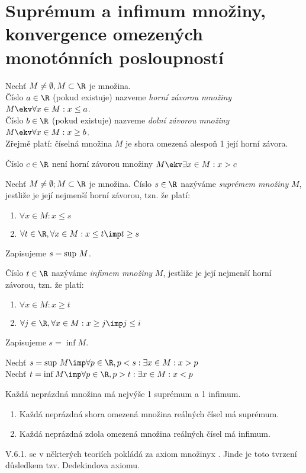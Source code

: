 
\BeginDoc{}
\def\posloup{$\zs{a_n}_{n=1}^{\infty}$}
\def\pos#1{\zs{#1}_{n=1}^{\infty}}
\def\li{\lim_{n\rightarrow\infty}}
\def\sup{{\rm sup\ }}
\def\sciwinfup{{\rm inf\ }}
\section{Suprémum a infimum množiny, konvergence omezených
monotónních posloupností}

\Def Nechť $M \neq \emptyset , M\subset \R$ je množina.\\
Číslo $a\in\R$ (pokud existuje) nazveme \emph{horní závorou množiny} $M\ekv \forall x \in M : x \le a$.\\
Číslo $b\in\R$ (pokud existuje) nazveme \emph{dolní  závorou množiny} $M\ekv \forall x \in M : x \ge b$.\\

\Pozenum
Zřejmě platí: číselná množina $M$ je shora omezená alespoň 1 její horní závora.
\item
	Číslo $c\in\R$  není horní závorou množiny $M\ekv \exists x \in M : x>c$
\End

\Def
Nechť $M\neq \emptyset; M\subset \R$ je množina.
Číslo $s\in\R$ nazýváme \emph{suprémem množiny} $M$, jestliže je její nejmenší horní závorou,
tzn. že platí:
\begin{enumerate}
	\item $\forall x \in M : x\le s$
	\item $\forall t \in \R,\forall x\in M: x \le t \imp t \ge s$
\end{enumerate}
Zapisujeme $s=\sup M$.

Číslo $t\in\R$ nazýváme \emph{infimem množiny} $M$, jestliže je její nejmenší horní závorou,
tzn. že platí:
\begin{enumerate}
	\item $\forall x \in M : x\ge t$
	\item $\forall j \in \R,\forall x\in M: x \ge j \imp j \le i$
\end{enumerate}
Zapisujeme $s=\inf M$.

\Pozenum
Nechť $s=\sup M \imp \forall p\in\R, p<s:\exists x \in M: x>p$\\
Nechť $t=\inf M \imp \forall p\in\R, p>t:\exists x \in M: x<p$\\
\item  Každá neprázdná množina má nejvýše 1 suprémum a 1 infimum.
\End
{}
\begin{enumerate}
	\item Každá neprázdná shora omezená množina reálných čísel má suprémum.
	\item Každá neprázdná zdola omezená množina reálných čísel má infimum.
\end{enumerate}
\Poz V.6.1. se v některých teoriích pokládá za axiom množinyx . Jinde je toto tvrzení
důsledkem tzv. Dedekindova axiomu.


